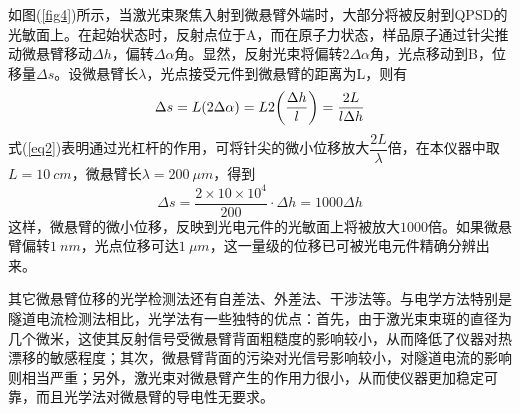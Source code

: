 \documentclass[a4paper]{article}
\begin{document}
如图(\ref{fig4})所示，当激光束聚焦入射到微悬臂外端时，大部分将被反射到QPSD的光敏面上。在起始状态时，反射点位于A，而在原子力状态，样品原子通过针尖推动微悬臂移动$\Delta h$，偏转$\Delta\alpha$角。显然，反射光束将偏转$2\Delta\alpha$角，光点移动到B，位移量$\Delta s$。设微悬臂长$\lambda$，光点接受元件到微悬臂的距离为L，则有
\begin{equation}
\Delta s = L(2\Delta\alpha) = L2\qty(\dfrac{\Delta h}{l}) = \dfrac{2L}{l\Delta h}\label{eq2}
\end{equation}
式(\ref{eq2})表明通过光杠杆的作用，可将针尖的微小位移放大$\dfrac{2L}{\lambda}$倍，在本仪器中取$ L=\SI{10}{cm} $，微悬臂长$\lambda = \SI{200}{\mu m}$，得到
\begin{equation}
\Delta s = \dfrac{2\times 10\times 10^4}{200}\cdot \Delta h = 1000 \Delta h\label{eq3}
\end{equation}
这样，微悬臂的微小位移，反映到光电元件的光敏面上将被放大$ 1000 $倍。如果微悬臂偏转$ \SI{1}{nm} $，光点位移可达$\SI{1}{\mu m}$，这一量级的位移已可被光电元件精确分辨出来。

其它微悬臂位移的光学检测法还有自差法、外差法、干涉法等。与电学方法特别是隧道电流检测法相比，光学法有一些独特的优点：首先，由于激光束束斑的直径为几个微米，这使其反射信号受微悬臂背面粗糙度的影响较小，从而降低了仪器对热漂移的敏感程度；其次，微悬臂背面的污染对光信号影响较小，对隧道电流的影响则相当严重；另外，激光束对微悬臂产生的作用力很小，从而使仪器更加稳定可靠，而且光学法对微悬臂的导电性无要求。
\end{document}
